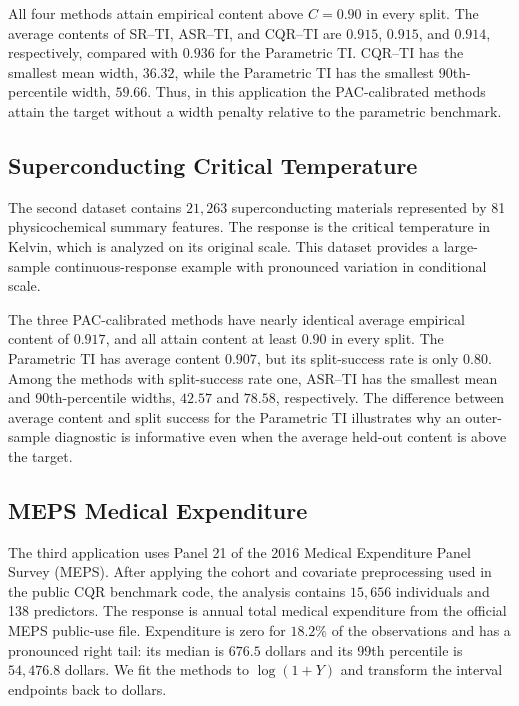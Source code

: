 All four methods attain empirical content above \(C=0.90\) in every split.
The average contents of SR--TI, ASR--TI, and CQR--TI are \(0.915\), \(0.915\),
and \(0.914\), respectively, compared with \(0.936\) for the Parametric TI.
CQR--TI has the smallest mean width, \(36.32\), while the Parametric TI has the
smallest 90th-percentile width, \(59.66\). Thus, in this application the
PAC-calibrated methods attain the target without a width penalty relative to
the parametric benchmark.

\subsection{Superconducting Critical Temperature}

The second dataset contains \(21{,}263\) superconducting materials represented
by 81 physicochemical summary features. The response is the critical
temperature in Kelvin, which is analyzed on its original scale. This dataset
provides a large-sample continuous-response example with pronounced variation
in conditional scale.

The three PAC-calibrated methods have nearly identical average empirical content
of \(0.917\), and all attain content at least \(0.90\) in every split. The
Parametric TI has average content \(0.907\), but its split-success rate is only
\(0.80\). Among the methods with split-success rate one, ASR--TI has the
smallest mean and 90th-percentile widths, \(42.57\) and \(78.58\),
respectively. The difference between average content and split success for the
Parametric TI illustrates why an outer-sample diagnostic is informative even
when the average held-out content is above the target.

\subsection{MEPS Medical Expenditure}

The third application uses Panel 21 of the 2016 Medical Expenditure Panel Survey
(MEPS). After applying the cohort and covariate preprocessing used in the public
CQR benchmark code, the analysis contains \(15{,}656\) individuals and 138
predictors. The response is annual total medical expenditure from the official
MEPS public-use file. Expenditure is zero for \(18.2\%\) of the observations and
has a pronounced right tail: its median is \(676.5\) dollars and its 99th
percentile is \(54{,}476.8\) dollars. We fit the methods to
\(\log(1+Y)\) and transform the interval endpoints back to dollars.

